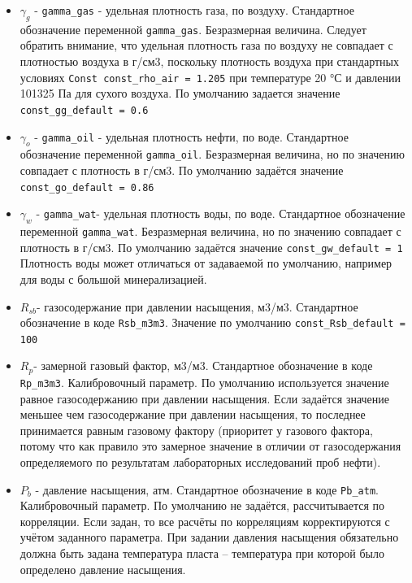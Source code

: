 \documentclass[]{scrreprt}
\begin{document}
\begin{itemize}
	
\item	$\gamma_g$  - \texttt{gamma_gas} - удельная плотность газа, по воздуху. Стандартное обозначение переменной \texttt{gamma_gas}. Безразмерная величина. Следует обратить внимание, что удельная плотность газа по воздуху не совпадает с плотностью воздуха в г/см3, поскольку плотность воздуха при стандартных условиях \texttt{Const const_rho_air = 1.205} при температуре 20 °С и давлении 101325 Па для сухого воздуха. По умолчанию задается значение \texttt{const_gg_default = 0.6}

\item $\gamma_o$  - \texttt{gamma_oil} - удельная плотность нефти, по воде. Стандартное обозначение переменной \texttt{gamma_oil}. Безразмерная величина, но по значению совпадает с плотность в г/см3. По умолчанию задаётся значение \texttt{const_go_default = 0.86}

\item $\gamma_w$  - \texttt{gamma_wat}- удельная плотность воды, по воде. Стандартное обозначение переменной \texttt{gamma_wat}. Безразмерная величина, но по значению совпадает с плотность в г/см3. По умолчанию задаётся значение \texttt{const_gw_default = 1} Плотность воды может отличаться от задаваемой по умолчанию, например для воды с большой минерализацией.  

\item $R_{sb}$- газосодержание при давлении насыщения, м3/м3. Стандартное обозначение в коде \texttt{Rsb_m3m3}. Значение по умолчанию \texttt{const_Rsb_default = 100}

\item $R_p$-  замерной газовый фактор, м3/м3. Стандартное обозначение в коде \texttt{Rp_m3m3}. Калибровочный параметр. По умолчанию используется значение равное газосодержанию при давлении насыщения. Если задаётся значение меньшее чем газосодержание при давлении насыщения, то последнее принимается равным газовому фактору (приоритет у газового фактора, потому что как правило это замерное значение в отличии от газосодержания определяемого по результатам лабораторных исследований проб нефти).

\item $P_b$ - давление насыщения, атм. Стандартное обозначение в коде \texttt{Pb_atm}. Калибровочный параметр. По умолчанию не задаётся, рассчитывается по корреляции. Если задан, то все расчёты по корреляциям корректируются с учётом заданного параметра. При задании давления насыщения обязательно должна быть задана температура пласта – температура при которой было определено давление насыщения. 


\end{itemize}
\end{document}
